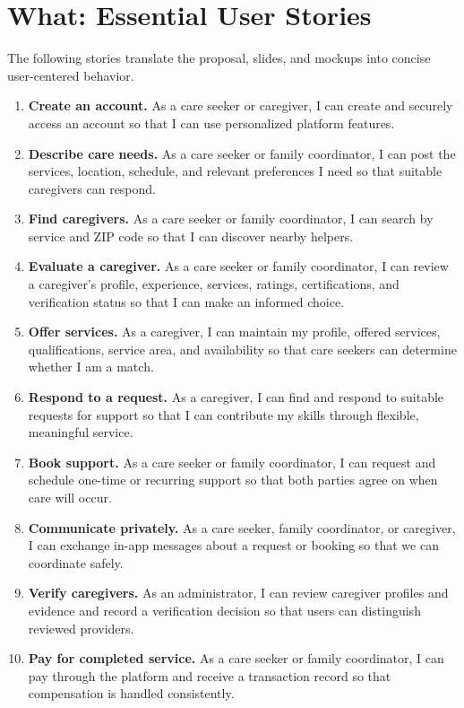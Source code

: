 \documentclass[11pt]{article}
\begin{document}
\section{What: Essential User Stories}

The following stories translate the proposal, slides, and mockups into concise user-centered behavior.

\begin{enumerate}
  \item \textbf{Create an account.} As a care seeker or caregiver, I can create and securely access an account so that I can use personalized platform features.
  \item \textbf{Describe care needs.} As a care seeker or family coordinator, I can post the services, location, schedule, and relevant preferences I need so that suitable caregivers can respond.
  \item \textbf{Find caregivers.} As a care seeker or family coordinator, I can search by service and ZIP code so that I can discover nearby helpers.
  \item \textbf{Evaluate a caregiver.} As a care seeker or family coordinator, I can review a caregiver's profile, experience, services, ratings, certifications, and verification status so that I can make an informed choice.
  \item \textbf{Offer services.} As a caregiver, I can maintain my profile, offered services, qualifications, service area, and availability so that care seekers can determine whether I am a match.
  \item \textbf{Respond to a request.} As a caregiver, I can find and respond to suitable requests for support so that I can contribute my skills through flexible, meaningful service.
  \item \textbf{Book support.} As a care seeker or family coordinator, I can request and schedule one-time or recurring support so that both parties agree on when care will occur.
  \item \textbf{Communicate privately.} As a care seeker, family coordinator, or caregiver, I can exchange in-app messages about a request or booking so that we can coordinate safely.
  \item \textbf{Verify caregivers.} As an administrator, I can review caregiver profiles and evidence and record a verification decision so that users can distinguish reviewed providers.
  \item \textbf{Pay for completed service.} As a care seeker or family coordinator, I can pay through the platform and receive a transaction record so that compensation is handled consistently.
\end{enumerate}
\end{document}
